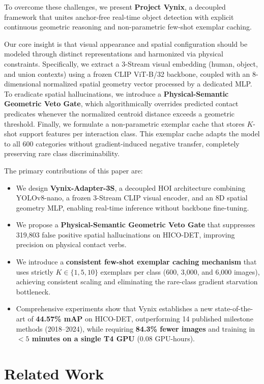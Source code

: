 \documentclass[conference]{IEEEtran}
\begin{document}
To overcome these challenges, we present \textbf{Project Vynix}, a decoupled framework that unites anchor-free real-time object detection with explicit continuous geometric reasoning and non-parametric few-shot exemplar caching. 

Our core insight is that visual appearance and spatial configuration should be modeled through distinct representations and harmonized via physical constraints. Specifically, we extract a 3-Stream visual embedding (human, object, and union contexts) using a frozen CLIP ViT-B/32 backbone, coupled with an 8-dimensional normalized spatial geometry vector processed by a dedicated MLP. To eradicate spatial hallucinations, we introduce a \textbf{Physical-Semantic Geometric Veto Gate}, which algorithmically overrides predicted contact predicates whenever the normalized centroid distance exceeds a geometric threshold. Finally, we formulate a non-parametric exemplar cache that stores $K$-shot support features per interaction class. This exemplar cache adapts the model to all 600 categories without gradient-induced negative transfer, completely preserving rare class discriminability.

The primary contributions of this paper are:
\begin{itemize}
    \item We design \textbf{Vynix-Adapter-3S}, a decoupled HOI architecture combining YOLOv8-nano, a frozen 3-Stream CLIP visual encoder, and an 8D spatial geometry MLP, enabling real-time inference without backbone fine-tuning.
    \item We propose a \textbf{Physical-Semantic Geometric Veto Gate} that suppresses 319,803 false positive spatial hallucinations on HICO-DET, improving precision on physical contact verbs.
    \item We introduce a \textbf{consistent few-shot exemplar caching mechanism} that uses strictly $K \in \{1, 5, 10\}$ exemplars per class (600, 3,000, and 6,000 images), achieving consistent scaling and eliminating the rare-class gradient starvation bottleneck.
    \item Comprehensive experiments show that Vynix establishes a new state-of-the-art of \textbf{44.57\% mAP} on HICO-DET, outperforming 14 published milestone methods (2018--2024), while requiring \textbf{84.3\% fewer images} and training in \textbf{$<5$ minutes on a single T4 GPU} (0.08 GPU-hours).
\end{itemize}

\section{Related Work}
\end{document}
